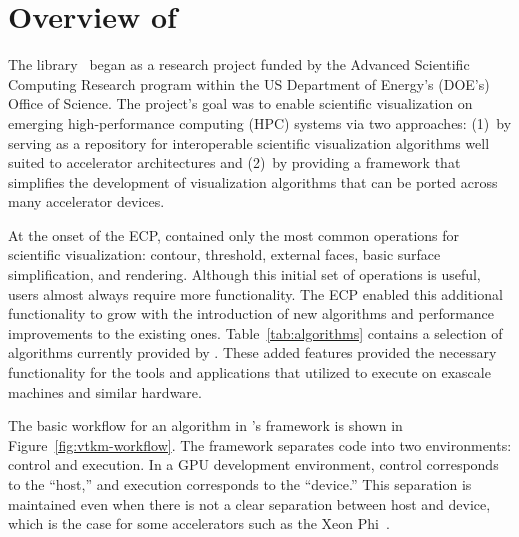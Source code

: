 \section{Overview of \vtkm}
\label{sec:overview}


The \vtkm library~\citep{Moreland2016} began as a research project funded
by the 
Advanced Scientific Computing Research program within the US Department of Energy's (DOE's) Office of Science.
The project's goal was to enable scientific visualization on emerging high-performance computing (HPC) systems via
two approaches:
(1)~by serving as a repository for interoperable scientific visualization algorithms well suited to accelerator architectures and (2)~by providing a framework that simplifies the development of visualization algorithms that can be ported across many accelerator devices.



At the onset of the ECP, \vtkm contained only the most common operations for scientific visualization: contour, threshold, external faces, basic surface simplification, and rendering.
Although this initial set of operations is useful, users almost always require more functionality.
The ECP enabled this additional functionality to grow with the introduction of new algorithms and performance improvements to the existing ones.
Table~\ref{tab:algorithms} contains a selection of algorithms currently provided by \vtkm.
These added features provided the necessary functionality for the tools and applications that utilized \vtkm to execute on exascale machines and similar hardware.


The basic workflow for an algorithm in \vtkm's framework is shown in Figure~\ref{fig:vtkm-workflow}.
The framework separates code into two environments: control and execution.
In a GPU development environment, control corresponds to the ``host,'' and execution corresponds to the ``device.''
This separation is maintained even when 
there is not a clear separation between host and device, which is the case for some accelerators such as the Xeon Phi~\citep{Jeffers2016}.

